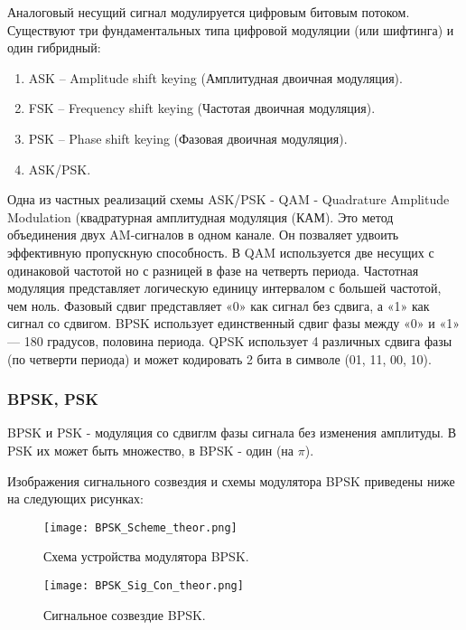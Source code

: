 Аналоговый несущий сигнал модулируется цифровым битовым потоком.
Существуют три фундаментальных типа цифровой модуляции (или шифтинга) и один гибридный:
\begin{enumerate}
\item ASK – Amplitude shift keying (Амплитудная двоичная модуляция).
\item FSK – Frequency shift keying (Частотая двоичная модуляция).
\item PSK – Phase shift keying (Фазовая двоичная модуляция).
\item ASK/PSK.
\end{enumerate}
Одна из частных реализаций схемы ASK/PSK - QAM - Quadrature Amplitude Modulation (квадратурная амплитудная модуляция (КАМ). Это метод объединения двух AM-сигналов в одном канале. Он позваляет удвоить эффективную пропускную способность. В QAM используется две несущих с одинаковой частотой но с разницей в фазе на четверть периода.
Частотная модуляция представляет логическую единицу интервалом с большей частотой, чем ноль.
Фазовый сдвиг представляет «0» как сигнал без сдвига, а «1» как сигнал со сдвигом.
BPSK использует единственный сдвиг фазы между «0» и «1» — 180 градусов, половина периода.
QPSK использует 4 различных сдвига фазы (по четверти периода) и может кодировать 2 бита в символе (01, 11, 00, 10).

\subsubsection{BPSK, PSK}
BPSK и PSK - модуляция со сдвиглм фазы сигнала без изменения амплитуды. В PSK их может быть множество, в BPSK - один (на $\pi$).

Изображения сигнального созвездия и схемы модулятора BPSK приведены ниже на следующих рисунках:
\begin{figure}[H]
	\begin{center}
		\texttt{[image: BPSK\_Scheme\_theor.png]}
		\caption{Схема устройства модулятора BPSK.} %
		\label{BPSK_Scheme_theor} %
	\end{center}
\end{figure}
\begin{figure}[H]
	\begin{center}
		\texttt{[image: BPSK\_Sig\_Con\_theor.png]}
		\caption{Сигнальное созвездие BPSK.} %
		\label{BPSK_Sig_Con_theor} %
	\end{center}
\end{figure}

